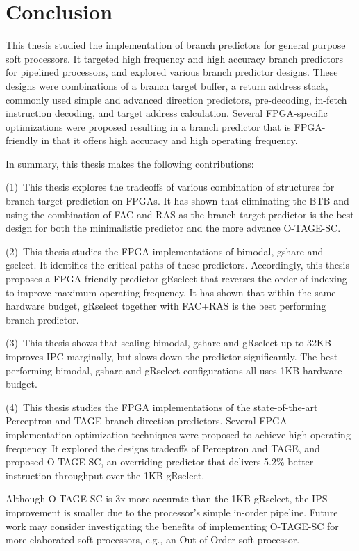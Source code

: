 \chapter{Conclusion}
\label{chap:conclusion}

This thesis studied the implementation of branch predictors for general purpose soft processors. It targeted high frequency and high accuracy branch predictors for pipelined processors, and explored various branch predictor designs. These designs were combinations of a branch target buffer, a return address stack, commonly used simple and advanced direction predictors, pre-decoding, in-fetch instruction decoding, and target address calculation. Several FPGA-specific optimizations were proposed resulting in a branch predictor that is FPGA-friendly in that it offers high accuracy and high operating frequency.

In summary, this thesis makes the following contributions:

(1)~This thesis explores the tradeoffs of various combination of structures for branch target prediction on FPGAs. It has shown that eliminating the BTB and using the combination of FAC and RAS as the branch target predictor is the best design for both the minimalistic predictor and the more advance \mbox{O-TAGE-SC}.

(2)~This thesis studies the FPGA implementations of bimodal, gshare and gselect. It identifies the critical paths of these predictors. Accordingly, this thesis proposes a FPGA-friendly predictor gRselect that reverses the order of indexing to improve maximum operating frequency. It has shown that within the same hardware budget, gRselect together with FAC+RAS is the best performing branch predictor.

(3)~This thesis shows that scaling bimodal, gshare and gRselect up to 32KB improves IPC marginally, but slows down the predictor significantly. The best performing bimodal, gshare and gRselect configurations all uses 1KB hardware budget.

(4)~This thesis studies the FPGA implementations of the state-of-the-art Perceptron and TAGE branch direction predictors. Several FPGA implementation optimization techniques were proposed to achieve high operating frequency. It explored the designs tradeoffs of Perceptron and TAGE, and proposed \mbox{O-TAGE-SC}, an overriding predictor that delivers 5.2\% better instruction throughput over the 1KB gRselect.

Although \mbox{O-TAGE-SC} is \mytilde 3x more accurate than the 1KB gRselect, the IPS improvement is  smaller due to the processor's simple in-order pipeline. Future work may consider investigating the benefits of implementing \mbox{O-TAGE-SC} for more elaborated soft processors, e.g., an Out-of-Order soft processor. 
